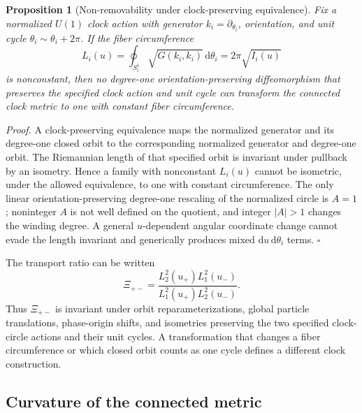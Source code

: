 \documentclass[11pt]{article}
\theoremstyle{plain}
\newtheorem{proposition}[theorem]{Proposition}
\newcommand{\dd}{\mathrm d}
\newcommand{\QED}{\hfill$\square$}
\begin{document}
\begin{proposition}[Non-removability under clock-preserving equivalence]
\label{prop:nonremove}
Fix a normalized $U(1)$ clock action with generator $k_i=\partial_{\theta_i}$, orientation, and unit cycle $\theta_i\sim\theta_i+2\pi$. If the fiber circumference
\begin{equation}
L_i(u)=\oint_{S_i^1}\sqrt{G(k_i,k_i)}\,\dd\theta_i=2\pi\sqrt{I_i(u)}
\end{equation}
is nonconstant, then no degree-one orientation-preserving diffeomorphism that preserves the specified clock action and unit cycle can transform the connected clock metric to one with constant fiber circumference.
\end{proposition}
\noindent\emph{Proof.} A clock-preserving equivalence maps the normalized generator and its degree-one closed orbit to the corresponding normalized generator and degree-one orbit. The Riemannian length of that specified orbit is invariant under pullback by an isometry. Hence a family with nonconstant $L_i(u)$ cannot be isometric, under the allowed equivalence, to one with constant circumference. The only linear orientation-preserving degree-one rescaling of the normalized circle is $A=1$; noninteger $A$ is not well defined on the quotient, and integer $|A|>1$ changes the winding degree. A general $u$-dependent angular coordinate change cannot evade the length invariant and generically produces mixed $\dd u\,\dd\theta_i$ terms. \QED

The transport ratio can be written
\begin{equation}
\Xi_{+-}=\frac{L_2^2(u_+)L_1^2(u_-)}{L_1^2(u_+)L_2^2(u_-)}.
\end{equation}
Thus $\Xi_{+-}$ is invariant under orbit reparameterizations, global particle translations, phase-origin shifts, and isometries preserving the two specified clock-circle actions and their unit cycles. A transformation that changes a fiber circumference or which closed orbit counts as one cycle defines a different clock construction.

\subsection{Curvature of the connected metric}
\end{document}
